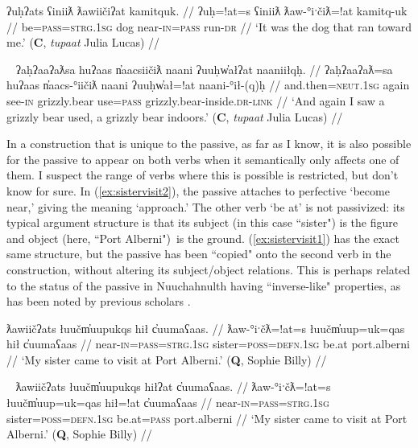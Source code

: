 {\ex \label{ex:dograntowardme}
\begingl
\glpreamble ʔuḥʔats ʕiniiƛ ƛawiičiʔat kamitquk. //
\gla ʔuḥ=!at=s ʕiniiƛ ƛaw-°iˑčiƛ=!at kamitq-uk //
\glb be=\textsc{pass}=\textsc{strg.1sg} dog near-\textsc{in}=\textsc{pass} run-\textsc{dr} //
\glft `It was the dog that ran toward me.' (\textbf{C}, \textit{tupaat} Julia Lucas) //
\endgl
\xe

\ex~ \label{ex:grizzlybearused}
\begingl
\glpreamble ʔaḥʔaaʔaƛsa huʔaas n̓aacsiičiƛ naani ʔuuḥw̓ałʔat naaniiłqḥ. //
\gla ʔaḥʔaaʔaƛ=sa huʔaas n̓aacs-°iičiƛ naani ʔuuḥw̓ał=!at naani-°ił-(q)ḥ //
\glb and.then=\textsc{neut.1sg} again see-\textsc{in} grizzly.bear use=\textsc{pass} grizzly.bear-inside.\textsc{dr}-\textsc{link} //
\glft `And again I saw a grizzly bear used, a grizzly bear indoors.' (\textbf{C}, \textit{tupaat} Julia Lucas) //
\endgl
\xe

In a construction that is unique to the passive, as far as I know, it is also possible for the passive to appear on both verbs when it semantically only affects one of them. I suspect the range of verbs where this is possible is restricted, but don't know for sure. In (\ref{ex:sistervisit2}), the passive attaches to perfective `become near,' giving the meaning `approach.' The other verb `be at' is not passivized: its typical argument structure is that its subject (in this case ``sister") is the figure and object (here, ``Port Alberni") is the ground. (\ref{ex:sistervisit1}) has the exact same structure, but the passive has been ``copied" onto the second verb in the construction, without altering its subject/object relations. This is perhaps related to the status of the passive in Nuuchahnulth having ``inverse-like" properties, as has been noted by previous scholars \citep{emanatian1988, braithwaite2003}.

\ex \label{ex:sistervisit2}
\begingl
\glpreamble ƛawiičʔats łuučm̓uupukqs hił c̓uumaʕaas. //
\gla ƛaw-°iˑčƛ=!at=s łuučm̓uup=uk=qas hił c̓uumaʕaas //
\glb near-\textsc{in}=\textsc{pass}=\textsc{strg.1sg} sister=\textsc{poss}=\textsc{defn.1sg} be.at port.alberni //
\glft `My sister came to visit at Port Alberni.' (\textbf{Q}, Sophie Billy) //
\endgl
\xe

\ex~ \label{ex:sistervisit1}
\begingl
\glpreamble ƛawiičʔats łuučm̓uupukqs hiłʔat c̓uumaʕaas. //
\gla ƛaw-°iˑčƛ=!at=s łuučm̓uup=uk=qas hił=!at c̓uumaʕaas //
\glb near-\textsc{in}=\textsc{pass}=\textsc{strg.1sg} sister=\textsc{poss}=\textsc{defn.1sg} be.at=\textsc{pass} port.alberni //
\glft `My sister came to visit at Port Alberni.' (\textbf{Q}, Sophie Billy) //
\endgl
\xe

}
